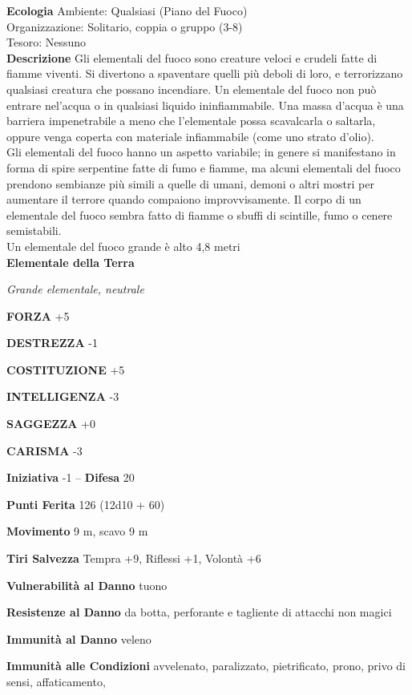 \begin{multicols}{2}
\textbf{Ecologia}
Ambiente: Qualsiasi (Piano del Fuoco)\\
Organizzazione: Solitario, coppia o gruppo (3-8)\\
Tesoro: Nessuno\\
\textbf{Descrizione}
Gli elementali del fuoco sono creature veloci e crudeli fatte di fiamme viventi. Si divertono a spaventare quelli più deboli di loro, e terrorizzano qualsiasi creatura che possano incendiare. Un elementale del fuoco non può entrare nel'acqua o in qualsiasi liquido ininfiammabile. Una massa d'acqua è una barriera impenetrabile a meno che l'elementale possa scavalcarla o saltarla, oppure venga coperta con materiale infiammabile (come uno strato d'olio).\\
Gli elementali del fuoco hanno un aspetto variabile; in genere si manifestano in forma di spire serpentine fatte di fumo e fiamme, ma alcuni elementali del fuoco prendono sembianze più simili a quelle di umani, demoni o altri mostri per aumentare il terrore quando compaiono improvvisamente. Il corpo di un elementale del fuoco sembra fatto di fiamme o sbuffi di scintille, fumo o cenere semistabili.\\

Un elementale del fuoco grande è alto 4,8 metri\\

\medskip{}\textbf{Elementale della Terra}

\emph{Grande elementale, neutrale}

\textbf{FORZA} +5

\textbf{DESTREZZA} -1

\textbf{COSTITUZIONE} +5

\textbf{INTELLIGENZA} -3

\textbf{SAGGEZZA} +0

\textbf{CARISMA} -3

\textbf{Iniziativa} -1 -- \textbf{Difesa} 20

\textbf{Punti Ferita} 126 (12d10 + 60)

\textbf{Movimento} 9 m, scavo 9 m

\textbf{Tiri Salvezza} Tempra +9, Riflessi +1, Volontà +6

\textbf{Vulnerabilità al Danno} tuono

\textbf{Resistenze al Danno} da botta, perforante e tagliente di attacchi non magici

\textbf{Immunità al Danno} veleno

\textbf{Immunità alle Condizioni} avvelenato, paralizzato, pietrificato, prono, privo di sensi, affaticamento,


\end{multicols}
